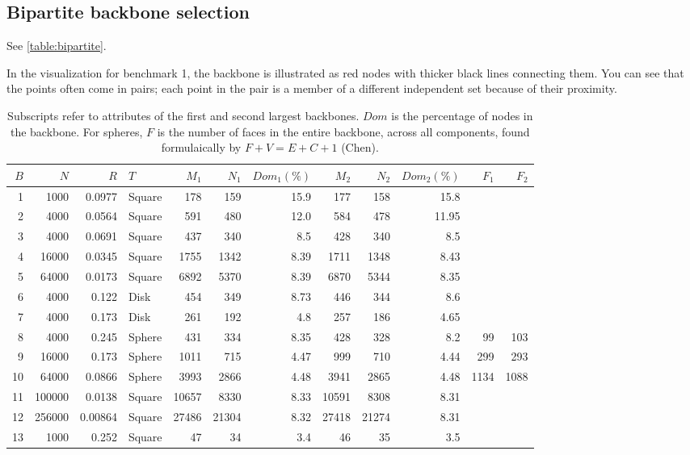 \documentclass[oneside, titlepage]{scrartcl}
\begin{document}
\subsection{Bipartite backbone selection}
See \autoref{table:bipartite}.

In the visualization for benchmark 1, the backbone is illustrated as red nodes with thicker black lines connecting them. You can see that the points often come in pairs; each point in the pair is a member of a different independent set because of their proximity.

\begin{table}[h]
\footnotesize
\centering
\begin{tabular}{r r r l | r r r r r r r r}
$B$ & $N$ & $R$ & $T$ & $M_1$ & $N_1$ & $Dom_1 (\%)$ & $M_2$ & $N_2$ & $Dom_2 (\%)$ & $F_1$ & $F_2$\\
\hline 
1 & 1000 & 0.0977 & Square & 178 & 159 & 15.9 & 177 & 158 & 15.8\\
2 & 4000 & 0.0564 & Square &591 & 480 & 12.0 & 584 & 478 & 11.95\\
3 & 4000 & 0.0691 & Square & 437 & 340 & 8.5 & 428 & 340& 8.5\\
4 & 16000 & 0.0345 & Square & 1755 & 1342 & 8.39 & 1711 & 1348 & 8.43\\
5 & 64000 & 0.0173 & Square & 6892 & 5370 & 8.39 & 6870 & 5344 & 8.35\\
6 & 4000 & 0.122 & Disk &454 & 349 & 8.73 & 446 & 344 & 8.6\\
7 & 4000 & 0.173 & Disk & 261 & 192 & 4.8 & 257 & 186 & 4.65\\
8 & 4000 & 0.245 & Sphere & 431 & 334 & 8.35 & 428 & 328 & 8.2 & 99 & 103\\
9 & 16000 & 0.173 & Sphere &1011 & 715 & 4.47 & 999 & 710 & 4.44 & 299 & 293\\
10 & 64000 & 0.0866 & Sphere & 3993 & 2866 & 4.48 & 3941 & 2865 & 4.48 & 1134 & 1088\\
11 & 100000 & 0.0138 & Square & 10657 & 8330 & 8.33 & 10591 & 8308 & 8.31\\
12 & 256000 & 0.00864 & Square & 27486 & 21304 & 8.32 & 27418 & 21274 & 8.31\\
13 & 1000 & 0.252 & Square & 47 & 34 & 3.4 & 46 & 35 & 3.5\\
\end{tabular}
\caption{Subscripts refer to attributes of the first and second largest backbones. $Dom$ is the percentage of nodes in the backbone. For spheres, $F$ is the number of faces in the entire backbone, across all components, found formulaically by $F + V = E + C + 1$ (Chen).}
\label{table:bipartite}
\end{table}
\end{document}
